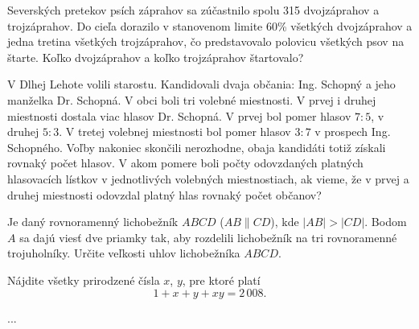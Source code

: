 {%
Severských pretekov psích záprahov sa zúčastnilo spolu 315 dvojzáprahov a trojzáprahov. Do cieľa dorazilo v stanovenom limite 60\% všetkých dvojzáprahov a jedna tretina všetkých trojzáprahov, čo predstavovalo polovicu všetkých psov na štarte. Koľko dvojzáprahov a koľko trojzáprahov štartovalo?}

{%
V Dlhej Lehote volili starostu. Kandidovali dvaja občania: Ing. Schopný a jeho manželka Dr. Schopná. V obci boli tri volebné miestnosti. V prvej i druhej miestnosti dostala viac hlasov Dr. Schopná. V prvej bol pomer hlasov $7:5$, v druhej $5:3$. V tretej volebnej miestnosti bol pomer hlasov $3:7$ v prospech Ing. Schopného. Voľby nakoniec skončili nerozhodne, obaja kandidáti totiž získali rovnaký počet hlasov. V akom pomere boli počty odovzdaných platných hlasovacích lístkov v jednotlivých volebných miestnostiach, ak vieme, že v prvej a druhej miestnosti odovzdal platný hlas rovnaký počet občanov?}

{%
Je daný rovnoramenný lichobežník $ABCD$ ($AB\parallel CD$), kde $|AB|>|CD|$. Bodom $A$ sa dajú viesť dve priamky tak, aby rozdelili lichobežník na tri rovnoramenné trojuholníky. Určite veľkosti uhlov lichobežníka $ABCD$.}

{%
Nájdite všetky prirodzené čísla $x$, $y$, pre ktoré platí
$$
1 + x + y + xy = 2\,008.
$$}

{%
...}

